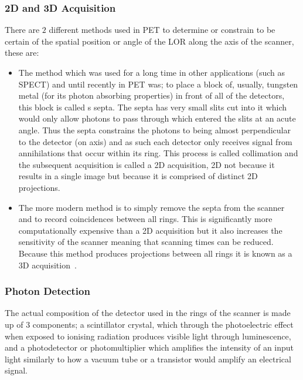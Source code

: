             \subsubsection{2D and 3D Acquisition} \label{2d_and_3d_acquisition}
                There are $2$ different methods used in \gls{PET} to determine or constrain to be certain of the spatial position or angle of the \gls{LOR} along the axis of the scanner, these are:
                
                \begin{itemize}
                    \item The method which was used for a long time in other applications (such as \gls{SPECT}) and until recently in \gls{PET} was; to place a block of, usually, tungsten metal (for its photon absorbing properties) in front of all of the detectors, this block is called s septa. The septa has very small slits cut into it which would only allow photons to pass through which entered the slits at an acute angle. Thus the septa constrains the photons to being almost perpendicular to the detector (on axis) and as such each detector only receives signal from annihilations that occur within its ring. This process is called collimation and the subsequent acquisition is called a \gls{2D} acquisition, \gls{2D} not because it results in a single image but because it is comprised of distinct \gls{2D} projections.
                    
                    \item The more modern method is to simply remove the septa from the scanner and to record coincidences between all rings. This is significantly more computationally expensive than a \gls{2D} acquisition but it also increases the sensitivity of the scanner meaning that scanning times can be reduced. Because this method produces projections between all rings it is known as a \gls{3D} acquisition~.
                \end{itemize}
            
            \subsubsection{Photon Detection} \label{photon_detection}
                The actual composition of the detector used in the rings of the scanner is made up of $3$ components; a scintillator crystal, which through the photoelectric effect when exposed to ionising radiation produces visible light through luminescence, and a photodetector or photomultiplier which amplifies the intensity of an input light similarly to how a vacuum tube or a transistor would amplify an electrical signal.
                

